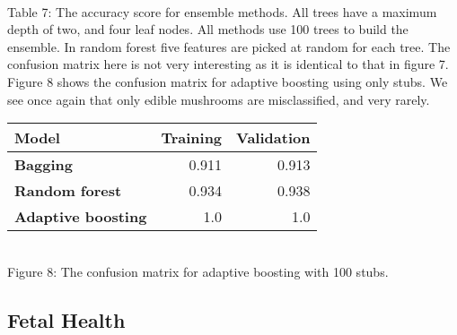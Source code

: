 \documentclass[11pt]{article}
\begin{document}
{ \hspace*{\fill} \\}
Table 7: The accuracy score for ensemble methods. All trees have a maximum depth of two, and four leaf nodes. All methods use 100 trees to build the ensemble. In random forest five features are picked at random for each tree. The confusion matrix here is not very interesting as it is identical to that in figure 7. Figure 8 shows the confusion matrix for adaptive boosting using only stubs. We see once again that only edible mushrooms are misclassified, and very rarely.
\begin{table}[h!]
	\begin{center}
		\label{tab:table1}
		\begin{tabular}{l|r|r}
			\textbf{Model}                                                 	& \textbf{Training} & \textbf{Validation}
			\\ \hline
			\textbf{Bagging}                             		             & 0.911        & 0.913              \\ \hline
			\textbf{Random forest}                                		     & 0.934        & 0.938              \\ \hline
			\textbf{Adaptive boosting}   							    	 & 1.0          & 1.0                \\ \hline
		\end{tabular}
	\end{center}
\end{table}

\begin{center}
\end{center}
{ \hspace*{\fill} \\}
Figure 8: The confusion matrix for adaptive boosting with 100 stubs.

    \hypertarget{fetal-health}{%
\subsection{Fetal Health}\label{fetal-health}}
\end{document}
